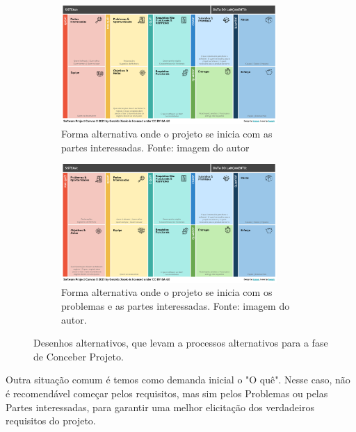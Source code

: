 \documentclass[a4]{report}
\begin{document}
\begin{figure}
    \centering
    \begin{subfigure}[b]{\textwidth}
    \centering
    \includegraphics[width=0.9\textwidth]{imagens/alternativa2.png}
    \caption{Forma alternativa onde o projeto se inicia com as partes interessadas. Fonte: imagem do autor}
    \label{fig:alter2}
    \end{subfigure}

    \vspace{1cm}

    \begin{subfigure}[b]{\textwidth}
    \centering
    \includegraphics[width=0.9\textwidth]{imagens/alternativa3.png}
    \caption{Forma alternativa onde o projeto se inicia com os problemas e as partes interessadas. Fonte: imagem do autor.}
    \label{fig:alter3}
    \end{subfigure}
    \caption{Desenhos alternativos, que levam a processos alternativos para a fase de Conceber Projeto.}
    \label{fig:alternativas}
\end{figure}

Outra situação comum é temos como demanda inicial o "O quê". Nesse caso, não é recomendável começar pelos requisitos, mas sim pelos Problemas ou pelas Partes interessadas, para garantir uma melhor elicitação dos verdadeiros requisitos do projeto.
\end{document}
